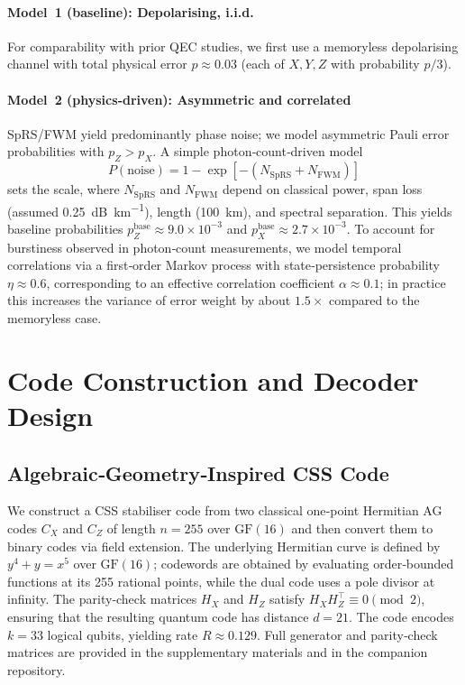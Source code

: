 \documentclass[conference]{IEEEtran}
\begin{document}
    \paragraph*{Model 1 (baseline): Depolarising, i.i.d.}  For comparability with prior QEC studies, we first use a 
memoryless depolarising channel with total physical error $p\approx 0.03$ (each of $X,Y,Z$ with probability $p/3$).

    \paragraph*{Model 2 (physics‑driven): Asymmetric and correlated}  SpRS/FWM yield predominantly phase noise; we model
  asymmetric Pauli error probabilities with $p_Z>p_X$.  A simple photon‑count‑driven model
    \begin{equation}
    P(\text{noise})=1-\exp[-(N_{\mathrm{SpRS}}+N_{\mathrm{FWM}})]
    \end{equation}
    sets the scale, where $N_{\mathrm{SpRS}}$ and $N_{\mathrm{FWM}}$ depend on classical power, span loss (assumed 
\SI{0.25}{\dB\per\kilo\meter}), length (\SI{100}{\kilo\meter}), and spectral separation.  This yields baseline 
probabilities $p_Z^{\mathrm{base}}\approx 9.0\times 10^{-3}$ and $p_X^{\mathrm{base}}\approx 2.7\times 10^{-3}$.  To 
account for burstiness observed in photon‑count measurements, we model temporal correlations via a first‑order Markov 
process with state‑persistence probability $\eta\approx 0.6$, corresponding to an effective correlation coefficient 
$\alpha\approx 0.1$; in practice this increases the variance of error weight by about $1.5\times$ compared to the 
memoryless case.

    \section{Code Construction and Decoder Design}

    \subsection{Algebraic‑Geometry‑Inspired CSS Code}
    We construct a CSS stabiliser code from two classical one‑point Hermitian AG codes $C_X$ and $C_Z$ of length $n=255$
 over $\mathrm{GF}(16)$ and then convert them to binary codes via field extension.  The underlying Hermitian curve is 
defined by $y^4+y = x^5$ over $\mathrm{GF}(16)$; codewords are obtained by evaluating order‑bounded functions at its 255
  rational points, while the dual code uses a pole divisor at infinity.  The parity‑check matrices $H_X$ and $H_Z$ 
satisfy $H_X H_Z^\top \equiv 0 \pmod{2}$, ensuring that the resulting quantum code has distance $d=21$.  The code 
encodes $k=33$ logical qubits, yielding rate $R\approx 0.129$.  Full generator and parity‑check matrices are provided in
  the supplementary materials and in the companion repository.
\end{document}
